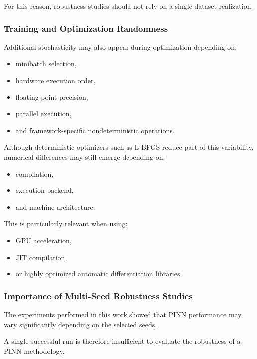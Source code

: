 For this reason, robustness studies should not rely on a single dataset realization.

\subsubsection{Training and Optimization Randomness}

Additional stochasticity may also appear during optimization depending on:
\begin{itemize}
    \item minibatch selection,
    \item hardware execution order,
    \item floating point precision,
    \item parallel execution,
    \item and framework-specific nondeterministic operations.
\end{itemize}

Although deterministic optimizers such as L-BFGS reduce part of this variability, numerical differences may still emerge depending on:
\begin{itemize}
    \item compilation,
    \item execution backend,
    \item and machine architecture.
\end{itemize}

This is particularly relevant when using:
\begin{itemize}
    \item GPU acceleration,
    \item JIT compilation,
    \item or highly optimized automatic differentiation libraries.
\end{itemize}

\subsubsection{Importance of Multi-Seed Robustness Studies}

The experiments performed in this work showed that PINN performance may vary significantly depending on the selected seeds.

A single successful run is therefore insufficient to evaluate the robustness of a PINN methodology.

